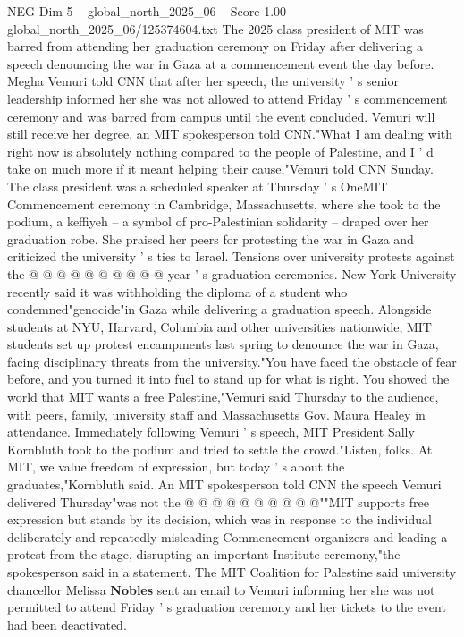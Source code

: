 \begin{textsample}{NEG Dim 5 – global\_north\_2025\_06 – Score 1.00 – global\_north\_2025\_06/125374604.txt}  \label{ex:f5_neg_373}
The 2025 class president of MIT was barred from attending her graduation ceremony on Friday after delivering a speech denouncing the war in Gaza at a commencement event the day before.
Megha Vemuri told CNN that after her speech, the university ' s senior leadership informed her she was not allowed to attend Friday ' s commencement ceremony and was barred from campus until the event concluded.
Vemuri will still receive her degree, an MIT spokesperson told CNN."What I am dealing with right now is absolutely nothing compared to the people of Palestine, and I ' d take on much more if it meant helping their cause,"Vemuri told CNN Sunday.
The class president was a scheduled speaker at Thursday ' s OneMIT Commencement ceremony in Cambridge, Massachusetts, where she took to the podium, a keffiyeh -- a symbol of pro-Palestinian solidarity -- draped over her graduation robe.
She praised her peers for protesting the war in Gaza and criticized the university ' s ties to Israel.
Tensions over university protests against the @ @ @ @ @ @ @ @ @ @ year ' s graduation ceremonies.
New York University recently said it was withholding the diploma of a student who condemned"genocide"in Gaza while delivering a graduation speech.
Alongside students at NYU, Harvard, Columbia and other universities nationwide, MIT students set up protest encampments last spring to denounce the war in Gaza, facing disciplinary threats from the university."You have faced the obstacle of fear before, and you turned it into fuel to stand up for what is right.
You showed the world that MIT wants a free Palestine,"Vemuri said Thursday to the audience, with peers, family, university staff and Massachusetts Gov.
Maura Healey in attendance.
Immediately following Vemuri ' s speech, MIT President Sally Kornbluth took to the podium and tried to settle the crowd."Listen, folks.
At MIT, we value freedom of expression, but today ' s about the graduates,"Kornbluth said.
An MIT spokesperson told CNN the speech Vemuri delivered Thursday"was not the @ @ @ @ @ @ @ @ @ @""MIT supports free expression but stands by its decision, which was in response to the individual deliberately and repeatedly misleading Commencement organizers and leading a protest from the stage, disrupting an important Institute ceremony,"the spokesperson said in a statement.
The MIT Coalition for Palestine said university chancellor Melissa \textbf{Nobles} sent an email to Vemuri informing her she was not permitted to attend Friday ' s graduation ceremony and her tickets to the event had been deactivated.

\end{textsample}
